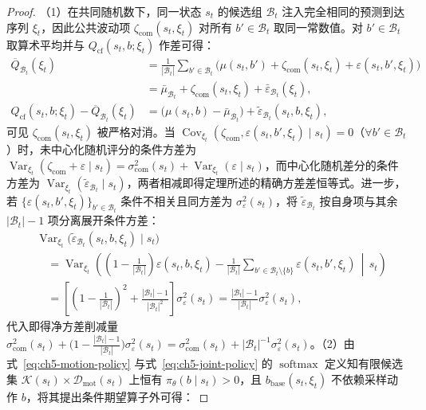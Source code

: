\begin{proof}
（1）在共同随机数下，同一状态 $s_t$ 的候选组 $\mathcal{B}_t$ 注入完全相同的预测到达序列 $\xi_t$，因此公共波动项 $\zeta_{\mathrm{com}}(s_t,\xi_t)$ 对所有 $b'\in\mathcal{B}_t$ 取同一常数值。对 $b'\in\mathcal{B}_t$ 取算术平均并与 $Q_{\mathrm{cf}}(s_t,b;\xi_t)$ 作差可得：
\begin{align*}
    \overline{Q}_{\mathcal{B}_t}(\xi_t)
    &=\frac{1}{|\mathcal{B}_t|}\sum_{b'\in\mathcal{B}_t}\Big(\mu(s_t,b')+\zeta_{\mathrm{com}}(s_t,\xi_t)+\varepsilon(s_t,b',\xi_t)\Big) \\
    &=\bar{\mu}_{\mathcal{B}_t}+\zeta_{\mathrm{com}}(s_t,\xi_t)+\bar{\varepsilon}_{\mathcal{B}_t}(\xi_t), \\
    Q_{\mathrm{cf}}(s_t,b;\xi_t)-\overline{Q}_{\mathcal{B}_t}(\xi_t)
    &=\big(\mu(s_t,b)-\bar{\mu}_{\mathcal{B}_t}\big)+\tilde{\varepsilon}_{\mathcal{B}_t}(s_t,b,\xi_t),
\end{align*}
可见 $\zeta_{\mathrm{com}}(s_t,\xi_t)$ 被严格对消。当 $\operatorname{Cov}_{\xi_t}(\zeta_{\mathrm{com}},\varepsilon(s_t,b',\xi_t)\mid s_t)=0$（$\forall b'\in\mathcal{B}_t$）时，未中心化随机评分的条件方差为 $\operatorname{Var}_{\xi_t}(\zeta_{\mathrm{com}}+\varepsilon\mid s_t)=\sigma_{\mathrm{com}}^2(s_t)+\operatorname{Var}_{\xi_t}(\varepsilon\mid s_t)$，而中心化随机差分的条件方差为 $\operatorname{Var}_{\xi_t}(\tilde{\varepsilon}_{\mathcal{B}_t}\mid s_t)$，两者相减即得定理所述的精确方差差恒等式。进一步，若 $\{\varepsilon(s_t,b',\xi_t)\}_{b'\in\mathcal{B}_t}$ 条件不相关且同方差为 $\sigma_\varepsilon^2(s_t)$，将 $\tilde{\varepsilon}_{\mathcal{B}_t}$ 按自身项与其余 $|\mathcal{B}_t|-1$ 项分离展开条件方差：
\begin{align*}
    &\operatorname{Var}_{\xi_t}\!\big(\tilde{\varepsilon}_{\mathcal{B}_t}(s_t,b,\xi_t)\mid s_t\big) \\
    &\quad=\operatorname{Var}_{\xi_t}\!\left(\left(1-\frac{1}{|\mathcal{B}_t|}\right)\varepsilon(s_t,b,\xi_t)
      -\frac{1}{|\mathcal{B}_t|}\sum_{b'\in\mathcal{B}_t\setminus\{b\}}\varepsilon(s_t,b',\xi_t)\,\middle|\,s_t\right) \\
    &\quad=\left[\left(1-\frac{1}{|\mathcal{B}_t|}\right)^2+\frac{|\mathcal{B}_t|-1}{|\mathcal{B}_t|^2}\right]\sigma_\varepsilon^2(s_t)
      =\frac{|\mathcal{B}_t|-1}{|\mathcal{B}_t|}\sigma_\varepsilon^2(s_t),
\end{align*}
代入即得净方差削减量 $\sigma_{\mathrm{com}}^2(s_t)+\big(1-\frac{|\mathcal{B}_t|-1}{|\mathcal{B}_t|}\big)\sigma_\varepsilon^2(s_t)=\sigma_{\mathrm{com}}^2(s_t)+|\mathcal{B}_t|^{-1}\sigma_\varepsilon^2(s_t)$。（2）由式~\eqref{eq:ch5-motion-policy} 与式~\eqref{eq:ch5-joint-policy} 的 $\operatorname{softmax}$ 定义知有限候选集 $\mathcal{K}(s_t)\times\mathcal{D}_{\mathrm{mot}}(s_t)$ 上恒有 $\pi_\theta(b\mid s_t)>0$，且 $b_{\mathrm{base}}(s_t,\xi_t)$ 不依赖采样动作 $b$，将其提出条件期望算子外可得：

\end{proof}
